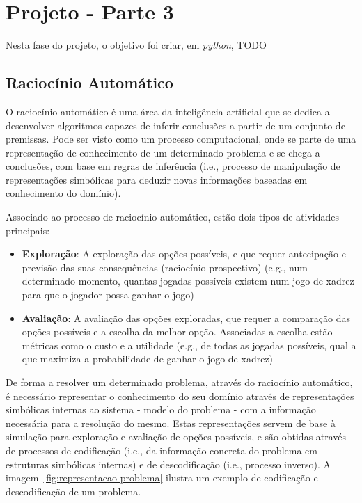 \chapter{Projeto - Parte 3}\label{ch:projeto-parte3}

Nesta fase do projeto, o objetivo foi criar, em \textit{python}, TODO


\section{Raciocínio Automático}\label{sec:raciocinio-automatico}

O raciocínio automático é uma área da inteligência artificial que se dedica a desenvolver algoritmos capazes de inferir conclusões a partir de um conjunto de premissas.
Pode ser visto como um processo computacional, onde se parte de uma representação de conhecimento de um determinado problema e se chega a conclusões, com base em regras de inferência (i.e., processo de manipulação de representações simbólicas para deduzir novas informações baseadas em conhecimento do domínio).

Associado ao processo de raciocínio automático, estão dois tipos de atividades principais:

\begin{itemize}
    \item \textbf{Exploração}: A exploração das opções possíveis, e que requer antecipação e previsão das suas consequências (raciocínio prospectivo) (e.g., num determinado momento, quantas jogadas possíveis existem num jogo de xadrez para que o jogador possa ganhar o jogo)
    \item \textbf{Avaliação}: A avaliação das opções exploradas, que requer a comparação das opções possíveis e a escolha da melhor opção.
    Associadas a escolha estão métricas como o custo e a utilidade (e.g., de todas as jogadas possíveis, qual a que maximiza a probabilidade de ganhar o jogo de xadrez)
\end{itemize}

De forma a resolver um determinado problema, através do raciocínio automático, é necessário representar o conhecimento do seu domínio através de representações simbólicas internas ao sistema - modelo do problema - com a informação necessária para a resolução do mesmo.
Estas representações servem de base à simulação para exploração e avaliação de opções possíveis, e são obtidas através de processos de codificação (i.e., da informação concreta do problema em estruturas simbólicas internas) e de descodificação (i.e., processo inverso).
A imagem~\ref{fig:representacao-problema} ilustra um exemplo de codificação e descodificação de um problema.

